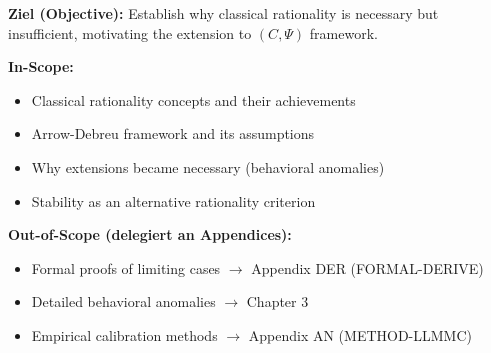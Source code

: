 %
%
%
%
%

\begin{tcolorbox}[
    colback=purple!5!white,
    colframe=purple!75!black,
    title={\textbf{Chapter Scope: Ziel / In-Scope / Out-of-Scope}},
    fonttitle=\bfseries
]

\textbf{Ziel (Objective):}
Establish why classical rationality is necessary but insufficient, motivating the extension to $(C, \Psi)$ framework.

\vspace{0.3cm}
\textbf{In-Scope:}
\begin{itemize}[nosep]
    \item Classical rationality concepts and their achievements
    \item Arrow-Debreu framework and its assumptions
    \item Why extensions became necessary (behavioral anomalies)
    \item Stability as an alternative rationality criterion
\end{itemize}

\vspace{0.3cm}
\textbf{Out-of-Scope (delegiert an Appendices):}
\begin{itemize}[nosep]
    \item Formal proofs of limiting cases $\rightarrow$ Appendix DER (FORMAL-DERIVE)
    \item Detailed behavioral anomalies $\rightarrow$ Chapter 3
    \item Empirical calibration methods $\rightarrow$ Appendix AN (METHOD-LLMMC)
\end{itemize}

\end{tcolorbox}

